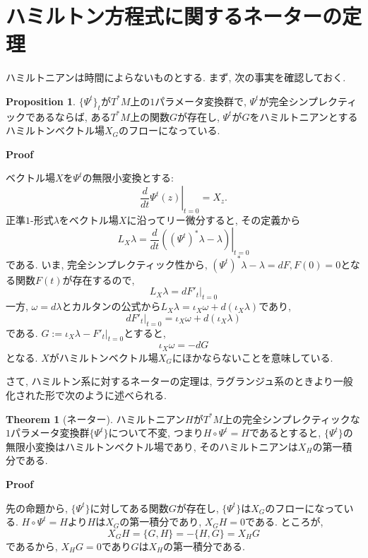 \documentclass[a4paper]{ujarticle}
\makeatletter
\numberwithin{equation}{section}
\theoremstyle{definition}
\newtheorem{theorem}{Theorem}
\newtheorem{proposition}{Proposition}
\renewenvironment{proof}[1][Proof]{\par
  \pushQED{\qed}%
  \normalfont \topsep6\p@\@plus6\p@\relax
  \trivlist
  \item\relax
  {\bfseries
  #1\@addpunct{.}}\hspace\labelsep\ignorespaces
}{%
  \popQED\endtrivlist\@endpefalse
}
\makeatother
\begin{document}
    \section{ハミルトン方程式に関するネーターの定理}
        ハミルトニアンは時間によらないものとする.
        まず, 次の事実を確認しておく.
        \begin{proposition}
            $\{\Psi^{t}\}_{t}$が$T^{*}M$上の$1$パラメータ変換群で, $\Psi^{t}$が完全シンプレクティックであるならば,
            ある$T^{*}M$上の関数$G$が存在し, $\Psi^{t}$が$G$をハミルトニアンとするハミルトンベクトル場$X_G$のフローになっている.
        \end{proposition}
        \begin{proof}
            ベクトル場$X$を$\Psi^{t}$の無限小変換とする:
            \[
                \left.\frac{d}{d t} \Psi^{t}(z)\right|_{t = 0} = X_z.
            \]
            正準$1$-形式$\lambda$をベクトル場$X$に沿ってリー微分すると, その定義から
            \[
                L_{X} \lambda = \left.\frac{d}{d t} ((\Psi^{t})^{*} \lambda - \lambda)\right|_{t = 0}
            \]
            である.
            いま, 完全シンプレクティック性から, $(\Psi^{t})^{*} \lambda - \lambda = dF, F(0) = 0$となる関数$F(t)$が存在するので,
            \[
                L_{X} \lambda = \left.dF'_t\right|_{t = 0}
            \]
            一方, $\omega = d \lambda$とカルタンの公式から$L_{X} \lambda = \iota_{X} \omega + d (\iota_{X} \lambda)$であり, 
            \[
                \left.dF'_t\right|_{t = 0} = \iota_{X} \omega + d (\iota_{X} \lambda)
            \]
            である. $G:= \iota_{X} \lambda - F'_{t}|_{t = 0}$とすると, 
            \[
                \iota_{X} \omega = - d G
            \]
            となる. $X$がハミルトンベクトル場$X_G$にほかならないことを意味している.
        \end{proof}

        さて, ハミルトン系に対するネーターの定理は, ラグランジュ系のときより一般化された形で次のように述べられる.
        \begin{theorem}[ネーター]
            ハミルトニアン$H$が$T^{*}M$上の完全シンプレクティックな$1$パラメータ変換群$\{\Psi^{t}\}$について不変, 
            つまり$H \circ \Psi^{t} = H$であるとすると,
            $\{\Psi^{t}\}$の無限小変換はハミルトンベクトル場であり, そのハミルトニアンは$X_{H}$の第一積分である.
        \end{theorem}
        \begin{proof}
            先の命題から, $\{\Psi^{t}\}$に対してある関数$G$が存在し, $\{\Psi^{t}\}$は$X_G$のフローになっている.
            $H \circ \Psi^{t} = H$より$H$は$X_{G}$の第一積分であり, $X_G H = 0$である.
            ところが,
            \[
                X_G H = \{G, H\} = - \{H, G\} = X_{H} G
            \]
            であるから, $X_{H} G = 0$であり$G$は$X_{H}$の第一積分である.
        \end{proof}
\end{document}

